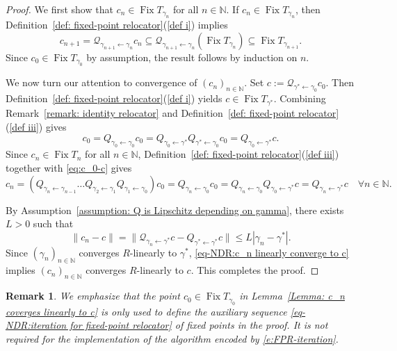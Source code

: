 \documentclass[a4paper,12pt]{article}
\newtheorem{remark}[theorem]{Remark}
\DeclareMathOperator{\Fix}{Fix}
\begin{document}
\begin{proof}
     We first show that $c_n\in\Fix T_{\gamma_n}$ for all $n\in\mathbb{N}$. If $c_n\in\Fix T_{\gamma_n}$, then Definition~\ref{def: fixed-point relocator}(\ref{def i}) implies 
     $$c_{n+1}=\mathcal{Q}_{\gamma_{n+1}\leftarrow\gamma_{n}}c_n\subseteq \mathcal{Q}_{\gamma_{n+1}\leftarrow\gamma_{n}}(\Fix T_{\gamma_n})\subseteq \Fix T_{\gamma_{n+1}}.$$
     Since $c_0\in\Fix T_{\gamma_0}$ by assumption, the result follows by induction on $n$.
     
     We now turn our attention to convergence of $(c_n)_{n\in\mathbb{N}}$. Set $c:=\mathcal{Q}_{\gamma^*\leftarrow\gamma_0}c_0$. Then Definition~\ref{def: fixed-point relocator}(\ref{def i}) yields $c\in\Fix T_{\gamma^*}$. Combining Remark~\ref{remark: identity relocator} and Definition~\ref{def: fixed-point relocator}(\ref{def iii}) gives
      \begin{equation}\label{eq:c_0-c}
      c_0=Q_{\gamma_0\leftarrow\gamma_0}c_0=Q_{\gamma_0\leftarrow\gamma^*}Q_{\gamma^*\leftarrow\gamma_0}c_0=Q_{\gamma_0\leftarrow\gamma^*}c.
      \end{equation}
     Since $c_n\in\Fix T_n$ for all $n\in\mathbb{N}$, Definition~\ref{def: fixed-point relocator}(\ref{def iii}) together with \eqref{eq:c_0-c} gives
       $$ c_n = (Q_{\gamma_n\leftarrow\gamma_{n-1}}\dots Q_{\gamma_2\leftarrow\gamma_1}Q_{\gamma_1\leftarrow\gamma_0})c_0 = Q_{\gamma_n\gets\gamma_0}c_0=Q_{\gamma_n\gets\gamma_0}Q_{\gamma_0\gets\gamma^*}c=Q_{\gamma_n\gets\gamma^*}c\quad\forall n\in \mathbb{N}.$$
    
    By Assumption~\ref{assumption: Q is Lipschitz depending on gamma}, there exists $L>0$ such that    \begin{equation}\label{eq-NDR:c_n linearly converge to c}  
            \|c_n-c\|=\|\mathcal{Q}_{\gamma_n\leftarrow\gamma^*}c-Q_{\gamma^*\leftarrow\gamma^*}c\|
            \leq L|\gamma_n-\gamma^*|.
    \end{equation}
    Since $(\gamma_n)_{n\in\mathbb{N}}$ converges $R$-linearly to $\gamma^*$, \eqref{eq-NDR:c_n linearly converge to c} implies $(c_n)_{n\in\mathbb{N}}$ converges $R$-linearly to $c$. This completes the proof.
    \end{proof}

\begin{remark}
    We emphasize that the point $c_0\in \Fix T_{\gamma_0}$ in Lemma~\ref{Lemma: c_n coverges linearly to c} is only used to define the auxiliary sequence \eqref{eq-NDR:iteration for fixed-point relocator} of fixed points in the proof. It is not required for the implementation of the algorithm encoded by \eqref{e:FPR-iteration}.
\end{remark}
\end{document}

